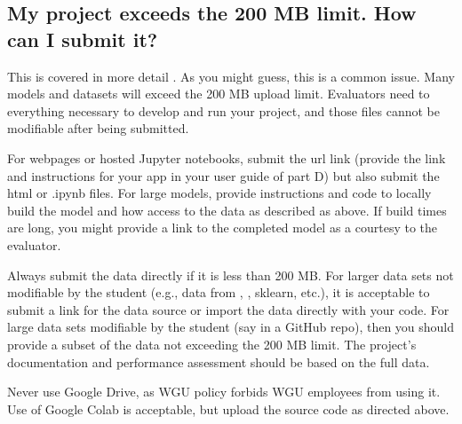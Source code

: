 \documentclass[letterpaper,10pt,english]{jupyterBook}
\begin{document}
\subsection{My project exceeds the 200 MB limit. How can I submit it?}
\label{\detokenize{task2_c/task2_part_c:my-project-exceeds-the-200-mb-limit-how-can-i-submit-it}}\label{\detokenize{task2_c/task2_part_c:task2-part-c-faq-my-project-exceeds-the-200-mb-limit}}
\sphinxAtStartPar
This is covered in more detail {\hyperref[\detokenize{task2_doc/task2_doc_finish:task2-doc-finish-how-to-submit-code}]{}}. As you might guess, this is a common issue. Many models and datasets will exceed the 200 MB upload limit. Evaluators need  to everything necessary to develop and run your project, and those files cannot be modifiable after being submitted.

\sphinxAtStartPar
For webpages or hosted Jupyter notebooks, submit the url link (provide the link and instructions for your app in your user guide of part D) but also submit the html or .ipynb files. For large models, provide instructions and code to locally build the model and how access to the data as described as above. If build times are long, you might provide a link to the completed model as a courtesy to the evaluator.

\sphinxAtStartPar
Always submit the data directly if it is less than 200 MB. For larger data sets not modifiable by the student (e.g., data from , , sklearn, etc.), it is acceptable to submit a link for the data source or import the data directly with your code. For large data sets modifiable by the student (say in a GitHub repo), then you should provide a subset of the data not exceeding the 200 MB limit. The project’s documentation and performance assessment should be based on the full data.

\sphinxAtStartPar
Never use Google Drive, as WGU policy forbids WGU employees from using it. Use of Google Colab is acceptable, but upload the source code as directed above.
\end{document}
